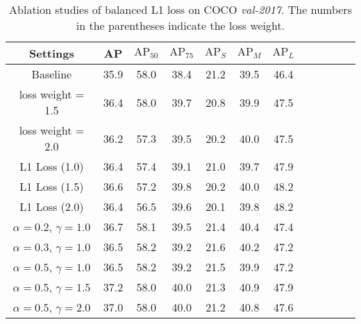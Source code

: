 \documentclass[10pt,twocolumn,letterpaper]{article}
\begin{document}
\begin{table}[htb]
	\centering
	\caption{Ablation studies of balanced L1 loss on COCO \emph{val-2017}. The numbers in the parentheses indicate the loss weight.}
	\vspace{-5pt}
	\addtolength{\tabcolsep}{-2pt}
	\begin{tabular}{*{12}{c}}
		\toprule
		Settings                        & AP   & $\text{AP}_{50}$ & $\text{AP}_{75}$ & $\text{AP}_{S}$ & $\text{AP}_{M}$ & $\text{AP}_{L}$ \\
		\midrule
		Baseline                        & 35.9 & 58.0             & 38.4             & 21.2            & 39.5            & 46.4            \\
		\midrule
		loss weight = 1.5               & 36.4 & 58.0             & 39.7             & 20.8            & 39.9            & 47.5            \\
		loss weight = 2.0               & 36.2 & 57.3             & 39.5             & 20.2            & 40.0            & 47.5            \\
		L1 Loss (1.0)                   & 36.4 & 57.4 & 39.1 & 21.0 & 39.7 &  47.9\\
		L1 Loss (1.5)                   & 36.6 & 57.2 & 39.8 & 20.2 & 40.0 & 48.2 \\
		L1 Loss (2.0)                   & 36.4 & 56.5 & 39.6 & 20.1 & 39.8 & 48.2 \\
		\midrule
		$\alpha = 0.2$,  $\gamma = 1.0$ & 36.7 & 58.1             & 39.5             & 21.4            & 40.4            & 47.4            \\
		$\alpha = 0.3$,  $\gamma = 1.0$ & 36.5 & 58.2             & 39.2             & 21.6            & 40.2            & 47.2            \\
		$\alpha = 0.5$,  $\gamma = 1.0$ & 36.5 & 58.2             & 39.2             & 21.5            & 39.9            & 47.2            \\
		\midrule
		$\alpha = 0.5$,  $\gamma = 1.5$ & 37.2 & 58.0             & 40.0             & 21.3            & 40.9            & 47.9            \\
		$\alpha = 0.5$,  $\gamma = 2.0$ & 37.0 & 58.0             & 40.0             & 21.2            & 40.8            & 47.6            \\
		\bottomrule
	\end{tabular}
	\vspace{-10pt}
	\label{tab:loss}
\end{table}
\end{document}
